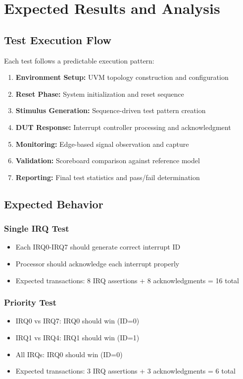 \documentclass[12pt,a4paper]{article}
\begin{document}
\section{Expected Results and Analysis}
\subsection{Test Execution Flow}
Each test follows a predictable execution pattern:

\begin{enumerate}
    \item \textbf{Environment Setup:} UVM topology construction and configuration
    \item \textbf{Reset Phase:} System initialization and reset sequence
    \item \textbf{Stimulus Generation:} Sequence-driven test pattern creation
    \item \textbf{DUT Response:} Interrupt controller processing and acknowledgment
    \item \textbf{Monitoring:} Edge-based signal observation and capture
    \item \textbf{Validation:} Scoreboard comparison against reference model
    \item \textbf{Reporting:} Final test statistics and pass/fail determination
\end{enumerate}

\subsection{Expected Behavior}
\subsubsection{Single IRQ Test}
\begin{itemize}
    \item Each IRQ0-IRQ7 should generate correct interrupt ID
    \item Processor should acknowledge each interrupt properly
    \item Expected transactions: 8 IRQ assertions + 8 acknowledgments = 16 total
\end{itemize}

\subsubsection{Priority Test}
\begin{itemize}
    \item IRQ0 vs IRQ7: IRQ0 should win (ID=0)
    \item IRQ1 vs IRQ4: IRQ1 should win (ID=1)
    \item All IRQs: IRQ0 should win (ID=0)
    \item Expected transactions: 3 IRQ assertions + 3 acknowledgments = 6 total
\end{itemize}
\end{document}
